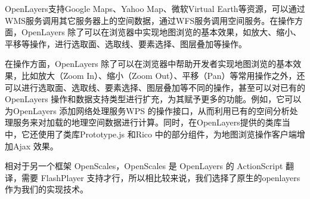 OpenLayers支持Google Maps、Yahoo Map、微软Virtual Earth等资源，可以通过WMS服务调用其它服务器上的空间数据，通过WFS服务调用空间服务。在操作方面，OpenLayers 除了可以在浏览器中实现地图浏览的基本效果，如放大、缩小、平移等操作，进行选取面、选取线、要素选择、图层叠加等操作。

在操作方面，OpenLayers 除了可以在浏览器中帮助开发者实现地图浏览的基本效果，比如放大（Zoom In）、缩小（Zoom Out）、平移（Pan）等常用操作之外，还可以进行选取面、选取线、要素选择、图层叠加等不同的操作，甚至可以对已有的OpenLayers 操作和数据支持类型进行扩充，为其赋予更多的功能。例如，它可以为OpenLayers 添加网络处理服务WPS 的操作接口，从而利用已有的空间分析处理服务来对加载的地理空间数据进行计算。同时，在OpenLayers提供的类库当中，它还使用了类库Prototype.js 和Rico 中的部分组件，为地图浏览操作客户端增加Ajax 效果。

相对于另一个框架 OpenScales，OpenScales 是 OpenLayers 的 ActionScript 翻译，需要 FlashPlayer 支持才行，所以相比较来说，我们选择了原生的openlayers作为我们的实现技术。




